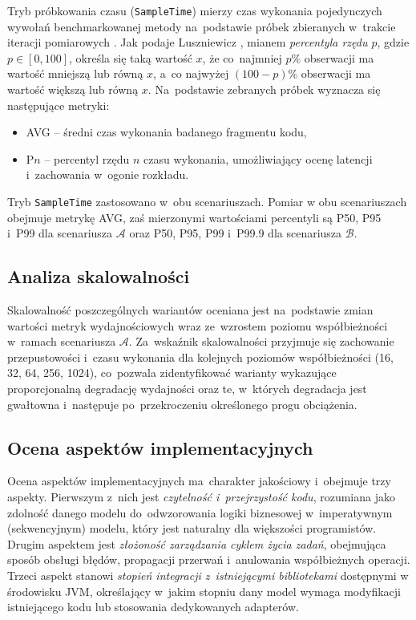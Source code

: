 Tryb próbkowania czasu (\texttt{SampleTime}) mierzy czas wykonania pojedynczych wywołań benchmarkowanej metody na~podstawie próbek zbieranych w~trakcie iteracji pomiarowych \cite{jmh-documentation}. Jak podaje Luszniewicz \cite{luszniewicz1970}, mianem \emph{percentyla rzędu $p$}, gdzie $p \in [0, 100]$, określa się taką wartość $x$, że co~najmniej $p\%$ obserwacji ma wartość mniejszą lub równą $x$, a~co najwyżej $(100-p)\%$ obserwacji ma wartość większą lub równą $x$. Na~podstawie zebranych próbek wyznacza się następujące metryki:
\begin{itemize}
    \item AVG -- średni czas wykonania badanego fragmentu kodu,
    \item P$n$ -- percentyl rzędu $n$ czasu wykonania, umożliwiający ocenę latencji i~zachowania w~ogonie rozkładu.
\end{itemize}
Tryb \texttt{SampleTime} zastosowano w~obu scenariuszach. Pomiar w obu scenariuszach obejmuje metrykę AVG, zaś mierzonymi wartościami percentyli są P50, P95 i~P99 dla scenariusza $\mathcal{A}$ oraz P50, P95, P99 i~P99.9 dla scenariusza $\mathcal{B}$.

\subsection{Analiza skalowalności}
\label{sec:scalability-analysis}

Skalowalność poszczególnych wariantów oceniana jest na~podstawie zmian wartości metryk wydajnościowych wraz ze~wzrostem poziomu współbieżności w~ramach scenariusza $\mathcal{A}$. Za~wskaźnik skalowalności przyjmuje się zachowanie przepustowości i~czasu wykonania dla kolejnych poziomów współbieżności (16, 32, 64, 256, 1024), co~pozwala zidentyfikować warianty wykazujące proporcjonalną degradację wydajności oraz te, w~których degradacja jest gwałtowna i~następuje po~przekroczeniu określonego progu obciążenia.

\subsection{Ocena aspektów implementacyjnych}
\label{sec:implementation-evaluation}

Ocena aspektów implementacyjnych ma~charakter jakościowy i~obejmuje trzy aspekty. Pierwszym z~nich jest \emph{czytelność i~przejrzystość kodu}, rozumiana jako zdolność danego modelu do~odwzorowania logiki biznesowej w~imperatywnym (sekwencyjnym) modelu, który jest naturalny dla większości programistów. Drugim aspektem jest \emph{złożoność zarządzania cyklem życia zadań}, obejmująca sposób obsługi błędów, propagacji przerwań i~anulowania współbieżnych operacji. Trzeci aspekt stanowi \emph{stopień integracji z~istniejącymi bibliotekami} dostępnymi w środowisku JVM, określający w~jakim stopniu dany model wymaga modyfikacji istniejącego kodu lub stosowania dedykowanych adapterów.